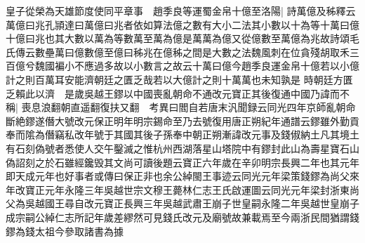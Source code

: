 皇子從榮為天雄節度使同平章事　趙季良等運蜀金帛十億至洛陽|{
	詩萬億及秭釋云萬億曰兆孔頴達曰萬億曰兆者依如算法億之數有大小二法其小數以十為等十萬曰億十億曰兆也其大數以萬為等數萬至萬為億是萬萬為億又從億數至萬億為兆故詩頌毛氏傳云數壘萬曰億數億至億曰秭兆在億秭之間是大數之法魏風刺在位貪殘胡取禾三百億兮魏國褊小不應過多故以小數言之故云十萬曰億今趙季良運金帛十億若以小億計之則百萬耳安能濟朝廷之匱乏哉若以大億計之則十萬萬也未知孰是}
時朝廷方匱乏賴此以濟　是歲吳越王鏐以中國喪亂朝命不通改元寶正其後復通中國乃諱而不稱|{
	喪息浪翻朝直遥翻復扶又翻　考異曰閻自若唐末汎聞録云同光四年京師亂朝命斷絶鏐遂僭大號改元保正明年明宗錫命至乃去號復用唐正朔紀年通譜云鏐雖外勤貢奉而隂為僭竊私改年號于其國其後子孫奉中朝正朔漸諱改元事及錢俶納土凡其境土有石刻偽號者悉使人交午鑿滅之惟杭州西湖落星山塔院中有鏐封此山為壽星寶石山偽詔刻之於石雖經鑱毁其文尚可讀後題云寶正六年歲在辛卯明宗長興二年也其元年即天成元年也好事者或傳曰保正非也余公綽閩王事迹云同光元年梁策錢鏐為尚父來年改寶正元年永隆三年吳越世宗文穆王薨林仁志王氏啟運圖云同光元年梁封浙東尚父為吳越國王尋自改元寶正長興三年吳越武肅王崩子世皇嗣永隆二年吳越世皇崩子成宗嗣公綽仁志所記年歲差繆然可見錢氏改元及廟號故兼載焉至今兩浙民間猶謂錢鏐為錢太祖今參取諸書為據}


